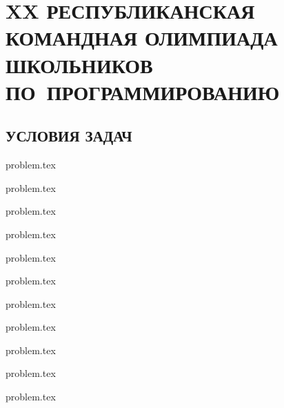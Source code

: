 \documentclass[a5paper, twoside, 11pt, openany]{book}
\begin{document}

\newpage



\newpage
{}
\chapter*{XX РЕСПУБЛИКАНСКАЯ КОМАНДНАЯ ОЛИМПИАДА ШКОЛЬНИКОВ ПО~ПРОГРАММИРОВАНИЮ}
\thispagestyle{empty}


\pagestyle{fancy}
\fancyfoot{}
\fancyhead[LE]{\thepage}
\fancyhead[LO]{\rightmark}
\fancyhead[RO]{\thepage}

\newpage



\newpage



\newpage



\newpage
\section[Условия задач]{УСЛОВИЯ ЗАДАЧ}
\thispagestyle{plain}

\newcommand{\importproblem}[1]{
\graphicspath{{problems/students/#1/statements/russian/}}
{problem.tex}	
}

\importproblem{prizes}
\importproblem{idiocracy}
\importproblem{robot-gardener}
\importproblem{simple-game}
\importproblem{rectangle-coloring}
\importproblem{foodshop-2}
\importproblem{interview-at-fun-club}
\importproblem{relay-race-with-weight}
\importproblem{suburban-grasshoppers}
\importproblem{pills}
\importproblem{debt-evasion}
\end{document}
